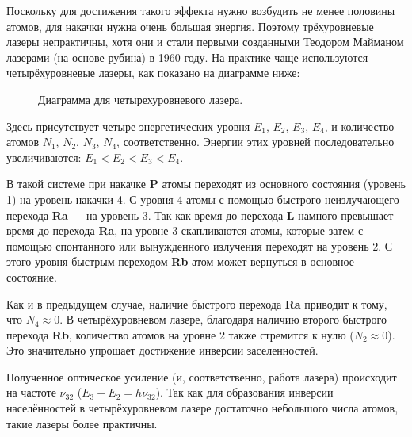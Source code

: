 \documentclass[a4paper, 12pt, openany]{book}
\begin{document}
	Поскольку для достижения такого эффекта нужно возбудить не менее половины атомов, для накачки нужна очень большая энергия. Поэтому трёхуровневые лазеры непрактичны, хотя они и стали первыми созданными Теодором Майманом лазерами (на основе рубина) в 1960 году. На практике чаще используются четырёхуровневые лазеры, как показано на диаграмме ниже:
	\begin{figure}[h]
		\caption{
			Диаграмма для четырехуровневого лазера.
		}
		\label{diag2}
	\end{figure}
	
	Здесь присутствует четыре энергетических уровня $E_1$, $E_2$, $E_3$, $E_4$, и количество атомов $N_1$, $N_2$, $N_3$, $N_4$, соответственно. Энергии этих уровней последовательно увеличиваются: $E_1 < E_2 < E_3 < E_4$.
	
	В такой системе при накачке \textbf{P} атомы переходят из основного состояния (уровень 1) на уровень накачки 4. С уровня 4 атомы с помощью быстрого неизлучающего перехода \textbf{Ra} — на уровень 3. Так как время до перехода \textbf{L} намного превышает время до перехода \textbf{Ra}, на уровне 3 скапливаются атомы, которые затем с помощью спонтанного или вынужденного излучения переходят на уровень 2. С этого уровня быстрым переходом \textbf{Rb} атом может вернуться в основное состояние.
	
	Как и в предыдущем случае, наличие быстрого перехода \textbf{Ra} приводит к тому, что $N_4 \approx 0$. В четырёхуровневом лазере, благодаря наличию второго быстрого перехода \textbf{Rb}, количество атомов на уровне 2 также стремится к нулю ($N_2 \approx 0$). Это значительно упрощает достижение инверсии заселенностей.
	
	Полученное оптическое усиление (и, соответственно, работа лазера) происходит на частоте $\nu_{32}$ ($E_3-E_2 = h\nu_{32}$). Так как для образования инверсии населённостей в четырёхуровневом лазере достаточно небольшого числа атомов, такие лазеры более практичны.
	
\end{document}
